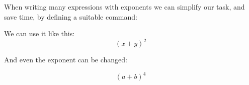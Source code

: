 \documentclass{article}
\begin{document}
When writing many expressions with exponents we can simplify our task, and save time, by defining a suitable command:

\newcommand{\plusbinomial}[3][2]{(#2 + #3)^#1}

We can use it like this: \[ \plusbinomial{x}{y} \]

And even the exponent can be changed:

\[ \plusbinomial[4]{a}{b} \]
\end{document}
